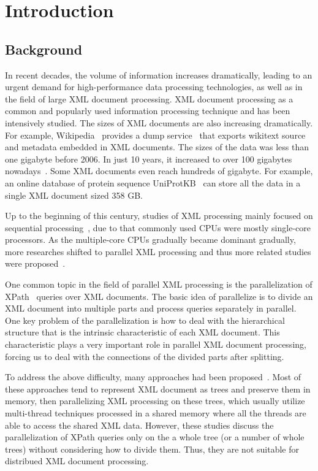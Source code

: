 
\chapter{Introduction}

\section{Background}

In recent decades, the volume of information increases dramatically, leading to
an urgent demand for high-performance data processing technologies, as well as
in the field of large XML document processing.  XML document processing as a
common and popularly used information processing technique and has been
intensively studied. The sizes of XML documents are also increasing
dramatically. For example,  Wikipedia~\cite{wiki} provides a dump
service~\cite{wikipediadump} that exports wikitext source and metadata embedded
in XML documents. The sizes of the data was less than one gigabyte before 2006.
In just 10 years, it increased to over 100 gigabytes nowadays~\cite{wikisize}.
Some XML documents even reach hundreds of gigabyte. For example, an online
database of protein sequence UniProtKB~\cite{UniProtKB} can store all the data
in a single XML document sized 358 GB.

Up to the beginning of this century, studies of XML processing mainly  focused
on sequential processing~\cite{Skil97,AlJYK02,Ne02,ToGr02,HAJR03},  due to that
commonly used CPUs were mostly single-core processors. As the multiple-core CPUs
gradually became dominant gradually,  more researches shifted to parallel XML
processing  and thus more related studies were
proposed~\cite{SAFu05,PaZC08,LFLQ08,ZhPC10}.

One common topic in the field of parallel XML processing is the parallelization
of XPath~\cite{xpath} queries over XML documents. The basic idea of parallelize
is to divide an XML document into multiple parts and process queries separately
in parallel. One key problem of the parallelization is how to deal with the
hierarchical structure that is the intrinsic characteristic of each XML
document. This characteristic plays a very important role in parallel XML
document processing, forcing us to deal with the connections of the divided
parts after splitting. 

To address the above difficulty, many approaches had been proposed~\cite{JLWO03,
SAFu05,NEMH07,BuLM08,Mats09, ZhPC10,ChLW13,HaMa16}. Most of these approaches
tend to represent XML document as trees and preserve them in memory, then
parallelizing XML processing on these trees, which usually utilize multi-thread
techniques processed in a shared memory where all the threads are able to access
the shared XML data. However, these studies discuss the parallelization of XPath
queries only on the a whole tree (or a number of whole trees) without
considering how to divide them. Thus, they are not suitable for distribued XML
document processing.

